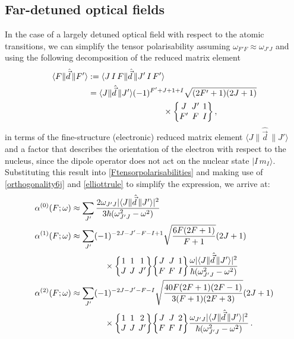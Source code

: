 \documentclass[../Thesis-IJspeert.tex]{subfiles}
\begin{document}
\subsection{Far-detuned optical fields}
In the case of a largely detuned optical field with respect to the atomic transitions, we can simplify the tensor polarisability assuming $\omega_{F'F}\approx\omega_{J'J}$ and using the following decomposition of the reduced matrix element
\begin{align}
\begin{split}
	 \langle F\| \hat{\vec{d}}\, \| F'\rangle &:= \langle J\, I\, F\| \hat{\vec{d}}\, \| J'\, I\, F'\rangle \\
	&=\langle J\| \hat{\vec{d}}\, \| J'\rangle(-1)^{F'+J+1+I} \sqrt{\left(2 F'+1\right)(2 J+1)} \\ &\hspace{9em}\times \tj{J}{J'}{1}{F'}{F}{I}\,,
\end{split}  
\end{align}
in terms of the fine-structure (electronic) reduced matrix element $\langle J\| \hat{\vec{d}}\, \| J'\rangle$ and a factor that describes the orientation of the electron with respect to the nucleus, since the dipole operator does not act on the nuclear state $\vert I\, m_I \rangle$. Substituting this result into \autoref{Ftensorpolarisabilities} and making use of \autoref{orthogonality6j} and \autoref{elliottrule} to simplify the expression, we arrive at:
\begin{align}
	\begin{split}
	 \alpha^{(0)}(F ; \omega) &\approx \sum_{J'} \frac{2 \omega_{J' J}\lvert \langle J\| \hat{\vec{d}}\, \| J'\rangle\rvert ^2}{3 \hbar\left(\omega_{J' J}^2-\omega^2\right)} \\
	 \alpha^{(1)}(F ; \omega) &\approx \sum_{J'}(-1)^{-2 J-J'-F-I+1} \sqrt{\frac{6 F(2 F+1)}{F+1}}(2 J+1) \\ 
	 &\hspace{4em}\times \tj{1}{1}{1}{J}{J}{J'} \tj{J}{J}{1}{F}{F}{I} \frac{\omega\lvert \langle J\| \hat{\vec{d}}\, \| J'\rangle\rvert ^2}{\hbar\left(\omega_{J' J}^2-\omega^2\right)}\\
	 \alpha^{(2)}(F ; \omega) &\approx \sum_{J'}(-1)^{-2 J-J'-F-I} \sqrt{\frac{40 F(2 F+1)(2 F-1)}{3(F+1)(2 F+3)}}(2 J+1)  \\
	&\hspace{4em}\times \tj{1}{1}{2}{J}{J}{J'}\tj{J}{J}{2}{F}{F}{I} \frac{\omega_{J' J}\lvert \langle J\| \hat{\vec{d}}\, \| J' \rangle\rvert^2}{\hbar\left(\omega_{J' J}^2-\omega^2\right)}\,.
\end{split}
\end{align}
\end{document}
